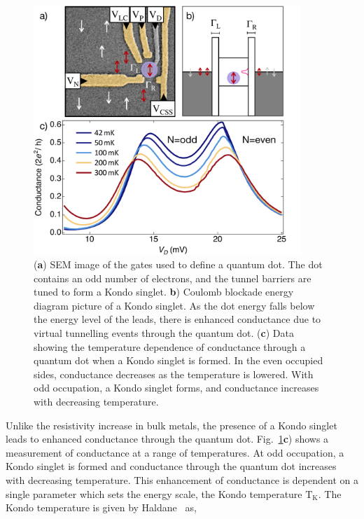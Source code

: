 \begin{figure}[!hbt]
 \begin{center}
  \includegraphics[width=0.9\textwidth]{figures/ch2/figure12.pdf}
  \caption[Kondo Effect in a Strongly Coupled Quantum Dot]{\label{fig:ch2/kondo_regime_conductance} 
  (\textbf{a}) SEM image of the gates used to define a quantum dot. The dot contains an odd number of electrons, and the tunnel barriers are tuned to form a Kondo singlet. \textbf{b}) Coulomb blockade energy diagram picture of a Kondo singlet. As the dot energy falls below the energy level of the leads, there is enhanced conductance due to virtual tunnelling events through the quantum dot. (\textbf{c}) Data showing the temperature dependence of conductance through a quantum dot when a Kondo singlet is formed. In the even occupied sides, conductance decreases as the temperature is lowered. With odd occupation, a Kondo singlet forms, and conductance increases with decreasing temperature.}
 \end{center}
\end{figure}



 Unlike the resistivity increase in bulk metals, the presence of a Kondo singlet leads to enhanced conductance through the quantum dot. Fig.~\ref{fig:ch2/kondo_regime_conductance}\textbf{c}) shows a measurement of conductance at a range of temperatures. At odd occupation, a Kondo singlet is formed and conductance through the quantum dot increases with decreasing temperature. This enhancement of conductance is dependent on a single parameter which sets the energy scale, the Kondo temperature $\mathrm{T_K}$. The Kondo temperature is given by Haldane~\cite{Haldane1978, kondo_thesis_stuttgart} as,
 

